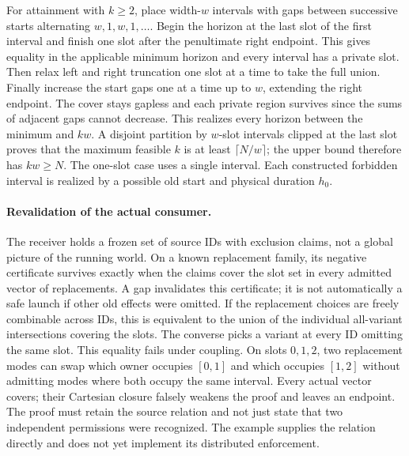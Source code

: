 \documentclass{article}
\begin{document}
For attainment with $k\ge2$, place width-$w$ intervals with gaps between successive starts alternating $w,1,w,1,\ldots$. Begin the horizon at the last slot of the first interval and finish one slot after the penultimate right endpoint. This gives equality in the applicable minimum horizon and every interval has a private slot. Then relax left and right truncation one slot at a time to take the full union. Finally increase the start gaps one at a time up to $w$, extending the right endpoint. The cover stays gapless and each private region survives since the sums of adjacent gaps cannot decrease. This realizes every horizon between the minimum and $kw$. A disjoint partition by $w$-slot intervals clipped at the last slot proves that the maximum feasible $k$ is at least $\lceil N/w\rceil$; the upper bound therefore has $kw\ge N$. The one-slot case uses a single interval. Each constructed forbidden interval is realized by a possible old start and physical duration $h_0$.

\paragraph{Revalidation of the actual consumer.}
The receiver holds a frozen set of source IDs with exclusion claims, not a global picture of the running world. On a known replacement family, its negative certificate survives exactly when the claims cover the slot set in every admitted vector of replacements. A gap invalidates this certificate; it is not automatically a safe launch if other old effects were omitted. If the replacement choices are freely combinable across IDs, this is equivalent to the union of the individual all-variant intersections covering the slots. The converse picks a variant at every ID omitting the same slot. This equality fails under coupling. On slots $0,1,2$, two replacement modes can swap which owner occupies $[0,1]$ and which occupies $[1,2]$ without admitting modes where both occupy the same interval. Every actual vector covers; their Cartesian closure falsely weakens the proof and leaves an endpoint. The proof must retain the source relation and not just state that two independent permissions were recognized. The example supplies the relation directly and does not yet implement its distributed enforcement.
\end{document}
